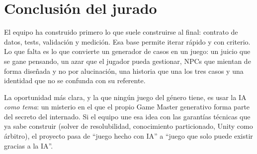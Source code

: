 \documentclass[11pt,a4paper]{article}
\begin{document}
\section{Conclusión del jurado}

El equipo ha construido primero lo que suele construirse al final: contrato de datos, tests,
validación y medición. Esa base permite iterar rápido y con criterio. Lo que falta es lo que
convierte un generador de casos en un juego: un juicio que se gane pensando, un azar que el jugador
pueda gestionar, NPCs que mientan de forma diseñada y no por alucinación, una historia que una los
tres casos y una identidad que no se confunda con su referente.

La oportunidad más clara, y la que ningún juego del género tiene, es usar la IA \emph{como tema}:
un misterio en el que el propio Game Master generativo forma parte del secreto del internado. Si el
equipo une esa idea con las garantías técnicas que ya sabe construir (solver de resolubilidad,
conocimiento particionado, Unity como árbitro), el proyecto pasa de ``juego hecho con IA'' a ``juego
que solo puede existir gracias a la IA''.
\end{document}
